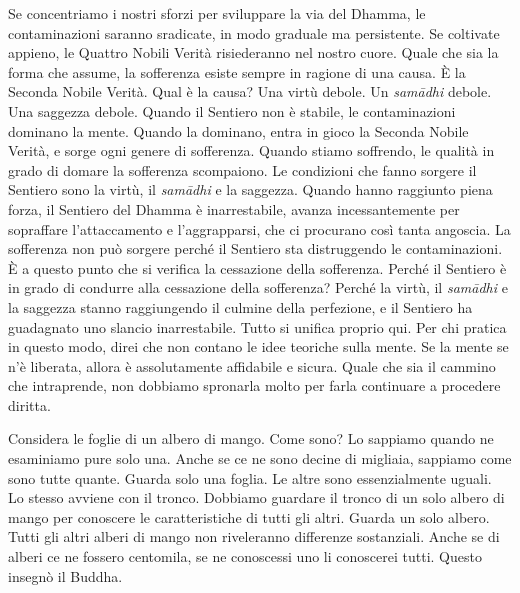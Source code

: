 Se concentriamo i nostri sforzi per sviluppare la via del Dhamma, le
contaminazioni saranno sradicate, in modo graduale ma persistente. Se
coltivate appieno, le Quattro Nobili Verità risiederanno nel nostro
cuore. Quale che sia la forma che assume, la sofferenza esiste sempre in
ragione di una causa. È la Seconda Nobile Verità. Qual è la causa? Una
virtù debole. Un \emph{samādhi} debole. Una saggezza debole. Quando il
Sentiero non è stabile, le contaminazioni dominano la mente. Quando la
dominano, entra in gioco la Seconda Nobile Verità, e sorge ogni genere
di sofferenza. Quando stiamo soffrendo, le qualità in grado di domare la
sofferenza scompaiono. Le condizioni che fanno sorgere il Sentiero sono
la virtù, il \emph{samādhi} e la saggezza. Quando hanno raggiunto piena
forza, il Sentiero del Dhamma è inarrestabile, avanza incessantemente
per sopraffare l'attaccamento e l'aggrapparsi, che ci procurano così
tanta angoscia. La sofferenza non può sorgere perché il Sentiero sta
distruggendo le contaminazioni. È a questo punto che si verifica la
cessazione della sofferenza. Perché il Sentiero è in grado di condurre
alla cessazione della sofferenza? Perché la virtù, il \emph{samādhi} e
la saggezza stanno raggiungendo il culmine della perfezione, e il
Sentiero ha guadagnato uno slancio inarrestabile. Tutto si unifica
proprio qui. Per chi pratica in questo modo, direi che non contano le
idee teoriche sulla mente. Se la mente se n'è liberata, allora è
assolutamente affidabile e sicura. Quale che sia il cammino che
intraprende, non dobbiamo spronarla molto per farla continuare a
procedere diritta.

Considera le foglie di un albero di mango. Come sono? Lo sappiamo quando
ne esaminiamo pure solo una. Anche se ce ne sono decine di migliaia,
sappiamo come sono tutte quante. Guarda solo una foglia. Le altre sono
essenzialmente uguali. Lo stesso avviene con il tronco. Dobbiamo
guardare il tronco di un solo albero di mango per conoscere le
caratteristiche di tutti gli altri. Guarda un solo albero. Tutti gli
altri alberi di mango non riveleranno differenze sostanziali. Anche se
di alberi ce ne fossero centomila, se ne conoscessi uno li conoscerei
tutti. Questo insegnò il Buddha.

